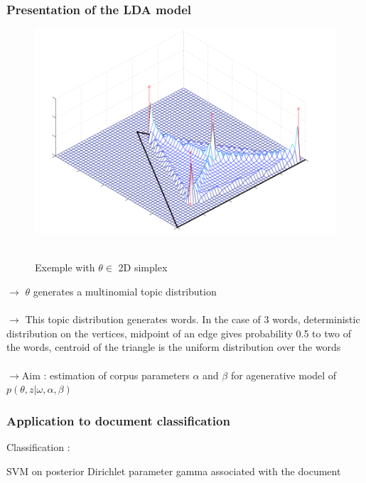 \documentclass{beamer}
\begin{document}
\begin{frame}
\frametitle{Presentation of the LDA model}
\begin{figure}
\includegraphics[width=12cm]{Simplex}~\\
\caption{Exemple with $ \theta \in $ 2D simplex }
\end{figure}
$\rightarrow$ $\theta$ generates a multinomial topic distribution~\\
~\\
$\rightarrow$ This topic distribution generates words. In the case of 3 words, deterministic distribution on the vertices, midpoint of an edge gives probability 0.5 to two of the words, centroid of the triangle is the uniform distribution over the words~\\
~\\
$\rightarrow$Aim : estimation of corpus parameters $\alpha$ and $\beta$ for agenerative model of $p(\theta,z | \omega, \alpha, \beta)$

\end{frame}



\begin{frame}
\frametitle{Application to document classification}


Classification : 

SVM on posterior Dirichlet parameter gamma associated with the document


\end{frame}
\end{document}
